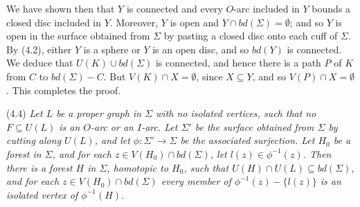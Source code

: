 We have shown then that $Y$ is connected and every $O$-arc included in $Y$ bounds a closed disc included in $Y$. Moreover, $Y$ is open and $Y \cap bd(\Sigma) = \emptyset$; and so $Y$ is open in the surface obtained from $\Sigma$ by pasting a closed disc onto each cuff of $\Sigma$. By (4.2), either $Y$ is a sphere or $Y$ is an open disc, and so $bd(Y)$ is connected. We deduce that $U(K) \cup bd(\Sigma)$ is connected, and hence there is a path $P$ of $K$ from $C$ to $bd(\Sigma) - C$. But $V(K) \cap X = \emptyset$, since $X \subseteq Y$, and so $V(P) \cap X = \emptyset$. This completes the proof.

\stmt
(4.4) \textit{Let $L$ be a proper graph in $\Sigma$ with no isolated vertices, such that no $F \subseteq U(L)$ is an $O$-arc or an $I$-arc. Let $\Sigma'$ be the surface obtained from $\Sigma$ by cutting along $U(L)$, and let $\phi \colon \Sigma' \to \Sigma$ be the associated surjection. Let $H_0$ be a forest in $\Sigma$, and for each $z \in V(H_0) \cap bd(\Sigma)$, let $l(z) \in \phi^{-1}(z)$. Then there is a forest $H$ in $\Sigma$, homotopic to $H_0$, such that $U(H) \cap U(L) \subseteq bd(\Sigma)$, and for each $z \in V(H_0) \cap bd(\Sigma)$ every member of $\phi^{-1}(z) - \{l(z)\}$ is an isolated vertex of $\phi^{-1}(H)$.}

